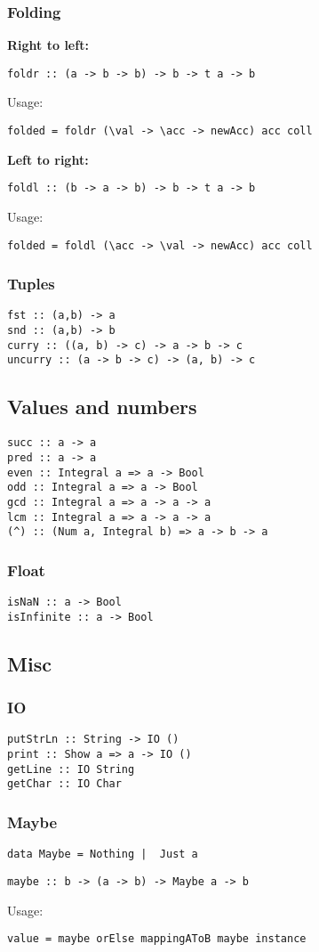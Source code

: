 \subsubsection{Folding}
\textbf{Right to left:}
\begin{verbatim}
foldr :: (a -> b -> b) -> b -> t a -> b
\end{verbatim}
Usage:
\begin{verbatim}
folded = foldr (\val -> \acc -> newAcc) acc coll
\end{verbatim}
\textbf{Left to right:} 
\begin{verbatim}
foldl :: (b -> a -> b) -> b -> t a -> b
\end{verbatim}
Usage:
\begin{verbatim}
folded = foldl (\acc -> \val -> newAcc) acc coll
\end{verbatim}
\subsubsection{Tuples}
\begin{verbatim}
fst :: (a,b) -> a
snd :: (a,b) -> b
curry :: ((a, b) -> c) -> a -> b -> c
uncurry :: (a -> b -> c) -> (a, b) -> c
\end{verbatim}
\subsection{Values and numbers}
\begin{verbatim}
succ :: a -> a
pred :: a -> a
even :: Integral a => a -> Bool
odd :: Integral a => a -> Bool
gcd :: Integral a => a -> a -> a
lcm :: Integral a => a -> a -> a
(^) :: (Num a, Integral b) => a -> b -> a 
\end{verbatim}
\subsubsection{Float}
\begin{verbatim}
isNaN :: a -> Bool
isInfinite :: a -> Bool
\end{verbatim}
\subsection{Misc}
\subsubsection{IO}
\begin{verbatim}
putStrLn :: String -> IO ()
print :: Show a => a -> IO ()
getLine :: IO String
getChar :: IO Char
\end{verbatim}
\subsubsection{Maybe}
\begin{verbatim}
data Maybe = Nothing |  Just a
\end{verbatim}
\begin{verbatim}
maybe :: b -> (a -> b) -> Maybe a -> b
\end{verbatim}
Usage:
\begin{verbatim}
value = maybe orElse mappingAToB maybe instance
\end{verbatim}
